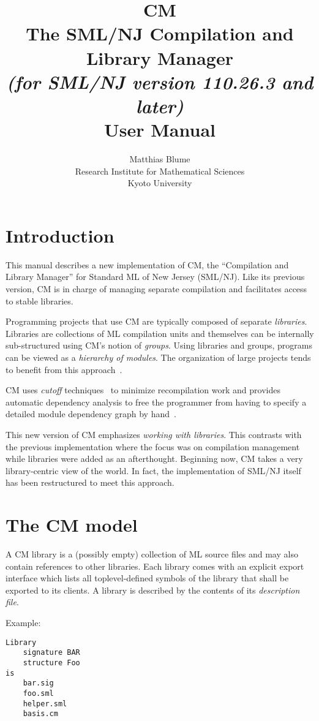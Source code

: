 \documentclass{article}
\author{Matthias Blume \\
Research Institute for Mathematical Sciences \\
Kyoto University}
\title{{\bf CM}\\
The SML/NJ Compilation and Library Manager \\
{\it\small (for SML/NJ version 110.26.3 and later)} \\
User Manual}
\begin{document}


\maketitle

\section{Introduction}

This manual describes a new implementation of CM, the ``Compilation
and Library Manager'' for Standard ML of New Jersey (SML/NJ).  Like its
previous version, CM is in charge of managing separate compilation and
facilitates access to stable libraries.

Programming projects that use CM are typically composed of separate
{\em libraries}.  Libraries are collections of ML compilation units
and themselves can be internally sub-structured using CM's notion of
{\em groups}.  Using libraries and groups, programs can be viewed as a
{\em hierarchy of modules}.  The organization of large projects tends
to benefit from this approach~\cite{blume:appel:cm99}.

CM uses {\em cutoff} techniques~\cite{tichy94} to minimize
recompilation work and provides automatic dependency analysis to free
the programmer from having to specify a detailed module dependency
graph by hand~\cite{blume:depend99}.

This new version of CM emphasizes {\em working with libraries}.  This
contrasts with the previous implementation where the focus was on
compilation management while libraries were added as an afterthought.
Beginning now, CM takes a very library-centric view of the world.  In
fact, the implementation of SML/NJ itself has been restructured to
meet this approach.

\section{The CM model}

A CM library is a (possibly empty) collection of ML source files and
may also contain references to other libraries.  Each library comes
with an explicit export interface which lists all toplevel-defined
symbols of the library that shall be exported to its clients.  A
library is described by the contents of its {\em description file}.

\noindent Example:

\begin{verbatim}
Library
    signature BAR
    structure Foo
is
    bar.sig
    foo.sml
    helper.sml
    basis.cm
\end{verbatim}
\end{document}
